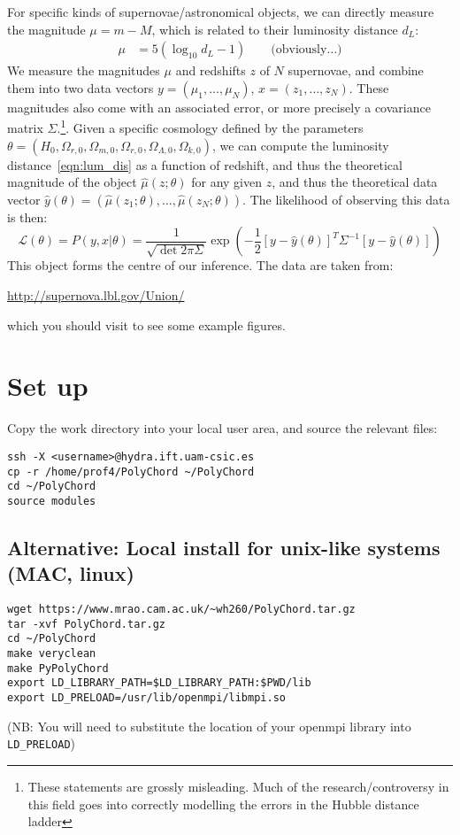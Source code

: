 \documentclass{article}
\begin{document}
For specific kinds of supernovae/astronomical objects, we can directly measure the magnitude $\mu=m-M$, which is related to their luminosity distance $d_L$:
\begin{align}
    \mu &= 5( \log_{10} d_L - 1) \qquad\text{(obviously\ldots)}
    \label{eqn:mag}
\end{align}
We measure the magnitudes $\mu$ and redshifts $z$ of $N$ supernovae, and combine them into two data vectors $y = (\mu_1,\ldots,\mu_N)$, $x=(z_1,\ldots,z_N)$. These magnitudes also come with an associated error, or more precisely a covariance matrix $\Sigma$.\footnote{These statements are grossly misleading. Much of the research/controversy in this field goes into correctly modelling the errors in the Hubble distance ladder}.
Given a specific cosmology defined by the parameters $\theta = (H_0, \Omega_{r,0},\Omega_{m,0},\Omega_{r,0},\Omega_{\Lambda,0},\Omega_{k,0})$, we can compute the luminosity distance~\eqref{eqn:lum_dis} as a function of redshift, and thus the theoretical magnitude of the object $\hat{\mu}(z;\theta)$ for any given $z$, and thus the theoretical data vector $\hat{y}(\theta) = (\hat{\mu}(z_1;\theta),\ldots,\hat{\mu}(z_N;\theta))$. The likelihood of observing this data is then:
\begin{equation}
    \mathcal{L}(\theta) = P(y,x|\theta) = \frac{1}{\sqrt{\det 2\pi \Sigma}} \exp{\left( -\frac{1}{2}[y-\hat{y}(\theta)]^T \Sigma^{-1}[y-\hat{y}(\theta)] \right)}
    \label{eqn:gaussian_likelihood}
\end{equation}
This object forms the centre of our inference. The data are taken from:

\noindent\url{http://supernova.lbl.gov/Union/}

\noindent{}which you should visit to see some example figures.






\section{Set up}
Copy the work directory into your local user area, and source the relevant files:
\begin{lstlisting}
ssh -X <username>@hydra.ift.uam-csic.es
cp -r /home/prof4/PolyChord ~/PolyChord
cd ~/PolyChord
source modules
\end{lstlisting}
\subsection*{Alternative: Local install for unix-like systems (MAC, linux)}
\begin{lstlisting}
wget https://www.mrao.cam.ac.uk/~wh260/PolyChord.tar.gz
tar -xvf PolyChord.tar.gz
cd ~/PolyChord
make veryclean
make PyPolyChord
export LD_LIBRARY_PATH=$LD_LIBRARY_PATH:$PWD/lib
export LD_PRELOAD=/usr/lib/openmpi/libmpi.so
\end{lstlisting}
(NB: You will need to substitute the location of your openmpi library into \lstinline{LD_PRELOAD})
\end{document}

